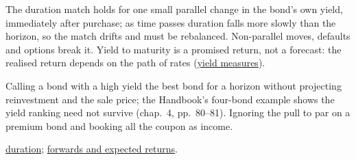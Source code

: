 \begin{qfmethod}
 The duration match holds for one small parallel change in the bond's own yield, immediately after purchase; as time passes duration falls more slowly than the horizon, so the match drifts and must be rebalanced. Non-parallel moves, defaults and options break it. Yield to maturity is a promised return, not a forecast: the realised return depends on the path of rates (\hyperref[def:bond-yield-spread-measures]{yield measures}).

 Calling a bond with a high yield the best bond for a horizon without projecting reinvestment and the sale price; the Handbook's four-bond example shows the yield ranking need not survive (chap.~4, pp.~80--81). Ignoring the pull to par on a premium bond and booking all the coupon as income.

 \hyperref[meth:yield-duration-pvbp]{duration}; \hyperref[meth:forward-rates-expected-returns]{forwards and expected returns}.

\end{qfmethod}

